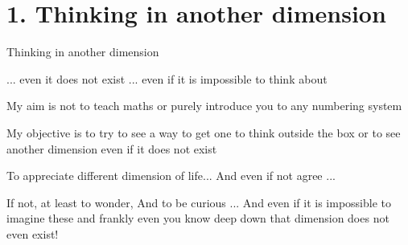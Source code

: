 \documentclass[letterpaper,10pt,english]{jupyterBook}
\begin{document}
\sphinxstepscope


\chapter{1. Thinking in another dimension}
\label{\detokenize{MacTwgssA1-think:thinking-in-another-dimension}}\label{\detokenize{MacTwgssA1-think::doc}}
\begin{sphinxVerbatim}[commandchars=\\\{\}]
Thinking in another dimension

... even it does not exist
... even if it is impossible to think about
\end{sphinxVerbatim}

\begin{sphinxVerbatim}[commandchars=\\\{\}]
My aim is not to \PYGZdq{}teach\PYGZdq{} maths 
    or purely introduce you to any numbering system
    
My objective is to 
    try to see a way to get one to think outside the box
    or to see another dimension even if it does not exist

To appreciate different dimension of life...
       And even if not agree ... 

If not, at least to wonder, 
       And to be curious ...
            And even if it is impossible to imagine these
                and frankly even you know deep down that dimension does not even exist!
\end{sphinxVerbatim}
\end{document}
